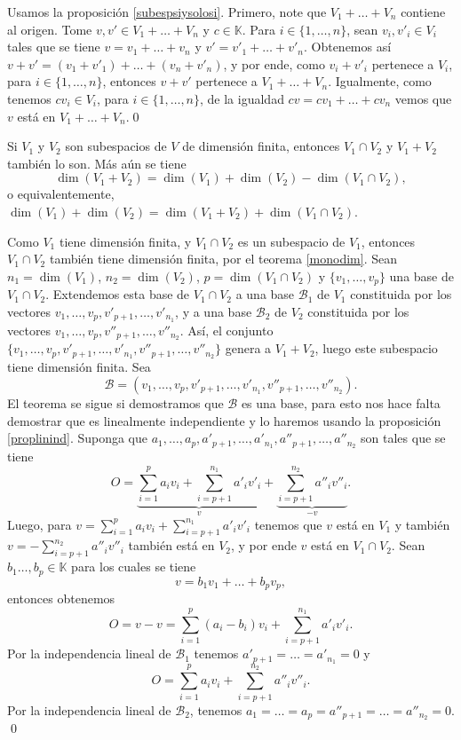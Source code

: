 \dem Usamos la proposición \ref{subespsiysolosi}. Primero, note que $V_1+\ldots+V_n$ contiene al origen. Tome $v,v'\in  V_1+\ldots+V_n$ y $c\in \mathbb{K}$. Para $i\in\{1,\ldots,n\}$, sean $v_i,v'_i\in V_i$ tales que se tiene $v=v_1+\ldots+v_n$ y $v'=v'_1+\ldots+v'_n$. Obtenemos as\'i $v+v'=(v_1+v'_1)+\ldots+(v_n+v'_n)$, y por ende, como $v_i+v'_i$ pertenece a $V_i$, para $i\in\{1,\ldots,n\}$, entonces $v+v'$ pertenece a $V_1+\ldots+V_n$. Igualmente, como tenemos $cv_i\in V_i$, para $i\in\{1,\ldots,n\}$, de la igualdad $cv=cv_1+\ldots+cv_n$ vemos que $v$ est\'a en $V_1+\ldots+V_n$.\qed

\begin{teo}\label{sumaint}
Si $V_1$ y $V_2$ son subespacios de $V$ de dimensi\'on finita, entonces $V_1\cap V_2$ y $V_1+V_2$ tambi\'en lo son. M\'as a\'un se tiene
\[
\dim(V_1+V_2)=\dim(V_1)+\dim(V_2)-\dim(V_1\cap V_2),
\]
o equivalentemente, $\dim(V_1)+\dim(V_2)=\dim(V_1+V_2)+\dim(V_1\cap V_2)$.
\end{teo}

\dem Como $V_1$ tiene dimensi\'on finita, y $V_1\cap V_2$ es un subespacio de $V_1$, entonces $V_1\cap V_2$ tambi\'en tiene dimensi\'on finita, por el teorema \ref{monodim}. Sean $n_1=\dim(V_1)$, $n_2=\dim(V_2)$, $p=\dim(V_1\cap V_2)$ y $\{v_1,\ldots,v_p\}$ una base de $V_1\cap V_2$. Extendemos esta base de $V_1\cap V_2$ a una base $\mathcal{B}_1$ de $V_1$ constituida por los vectores $v_1,\ldots,v_p,v'_{p+1},\ldots,v'_{n_1}$, y a una base $\mathcal{B}_2$ de $V_2$ constituida por los vectores $v_1,\ldots,v_p,v''_{p+1},\ldots,v''_{n_2}$. As\'i, el conjunto $\{v_1,\ldots,v_p,v'_{p+1},\ldots,v'_{n_1},v''_{p+1},\ldots,v''_{n_2}\}$ genera a $V_1+V_2$, luego este subespacio tiene dimensi\'on finita. Sea $$\mathcal{B}=(v_1,\ldots,v_p,v'_{p+1},\ldots,v'_{n_1},v''_{p+1},\ldots,v''_{n_2}).$$ El teorema se sigue si demostramos que $\mathcal{B}$ es una base, para esto nos hace falta demostrar que es linealmente independiente y lo haremos usando la proposici\'on \ref{proplinind}. Suponga que $a_1,\ldots,a_p,a'_{p+1},\ldots,a'_{n_1},a''_{p+1},\ldots,a''_{n_2}$ son tales que se tiene
\[
O=\underbrace{\sum_{i=1}^p a_iv_i+\sum_{i=p+1}^{n_1}a'_iv'_i}_{v}+\underbrace{\sum_{i=p+1}^{n_2} a''_iv''_i}_{-v}.
\]
Luego, para $v=\sum_{i=1}^p a_iv_i+\sum_{i=p+1}^{n_1}a'_iv'_i$ tenemos que $v$ est\'a en $V_1$ y también $v=-\sum_{i=p+1}^{n_2} a''_iv''_i$ tambi\'en está en $V_2$, y por ende $v$ est\'a en $V_1\cap V_2$. Sean $b_1\ldots,b_p\in \mathbb{K}$ para los cuales se tiene
\[
v=b_1v_1+\ldots+b_pv_p,
\]
entonces obtenemos
\[
O=v-v=\sum_{i=1}^p (a_i-b_i)v_i+\sum_{i=p+1}^{n_1}a'_iv'_i.
\]
Por la independencia lineal de $\mathcal{B}_1$ tenemos $a'_{p+1}=\ldots=a'_{n_1}=0$ y
\[
O=\sum_{i=1}^p a_iv_i+\sum_{i=p+1}^{n_2} a''_iv''_i.
\]
Por la independencia lineal de $\mathcal{B}_2$, tenemos $a_1=\ldots=a_p=a''_{p+1}=\ldots=a''_{n_2}=0$. \qed

